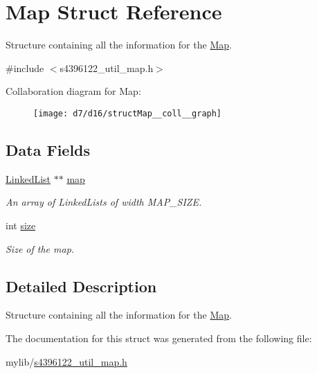 \hypertarget{structMap}{}\section{Map Struct Reference}
\label{structMap}


Structure containing all the information for the \hyperlink{structMap}{Map}.  




{\ttfamily \#include $<$s4396122\+\_\+util\+\_\+map.\+h$>$}



Collaboration diagram for Map\+:\nopagebreak
\begin{figure}[H]
\begin{center}
\leavevmode
\texttt{[image: d7/d16/structMap\_\_coll\_\_graph]}
\end{center}
\end{figure}
\subsection*{Data Fields}
\begin{DoxyCompactItemize}
\item 
\hyperlink{structLinkedList}{Linked\+List} $\ast$$\ast$ \hyperlink{structMap_ace4bbefe0154f313258c4d68b8bcc500}{map}\hypertarget{structMap_ace4bbefe0154f313258c4d68b8bcc500}{}\label{structMap_ace4bbefe0154f313258c4d68b8bcc500}

\begin{DoxyCompactList}\small\item\em An array of Linked\+Lists of width M\+A\+P\+\_\+\+S\+I\+ZE. \end{DoxyCompactList}\item 
int \hyperlink{structMap_ae00b1f478d27d81e4274788ef0b4f7af}{size}\hypertarget{structMap_ae00b1f478d27d81e4274788ef0b4f7af}{}\label{structMap_ae00b1f478d27d81e4274788ef0b4f7af}

\begin{DoxyCompactList}\small\item\em Size of the map. \end{DoxyCompactList}\end{DoxyCompactItemize}


\subsection{Detailed Description}
Structure containing all the information for the \hyperlink{structMap}{Map}. 

The documentation for this struct was generated from the following file\+:\begin{DoxyCompactItemize}
\item 
mylib/\hyperlink{s4396122__util__map_8h}{s4396122\+\_\+util\+\_\+map.\+h}\end{DoxyCompactItemize}
